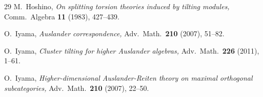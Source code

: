 \documentclass[12pt,reqno]{amsart}
\def\cA{\mathscr{A}}
\numberwithin{equation}{section}
\theoremstyle{definition}
\theoremstyle{theorem}
\theoremstyle{definition}
\begin{document}
\begin{thebibliography}{29}
  M.\ Hoshino, {\it On splitting torsion theories induced by tilting modules,} Comm.\ Algebra {\bf 11} (1983), 427--439.





  O.\ Iyama, {\it Auslander correspondence,} Adv.\ Math.\ {\bf 210} (2007), 51--82.

  O.\ Iyama, {\it Cluster tilting for higher Auslander algebras,} Adv.\ Math.\ {\bf 226} (2011), 1--61.

  O.\ Iyama, {\it Higher-dimensional Auslander-Reiten theory on maximal orthogonal subcategories,} Adv.\ Math.\ {\bf 210} (2007), 22--50.


%
%



\end{thebibliography}
\end{document}
